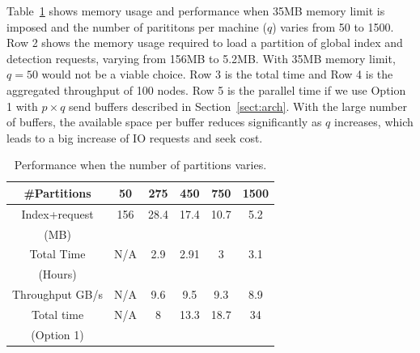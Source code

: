  
Table~\ref{tab:overall} shows memory usage and performance when 35MB memory limit is imposed and
the number of parititons per machine ($q$) varies from 50 to 1500.
Row 2 shows the memory usage required to load a partition of global index and detection requests,
varying from 156MB to 5.2MB. With  35MB memory limit,  $q=50$ would not be a viable choice.
Row 3 is the total time and Row 4 is  the aggregated throughput of  100 nodes.
Row 5 is  the parallel time if  we use Option 1 with $p\times q$ send buffers 
described in Section~\ref{sect:arch}. 
With the large number of buffers, the available space per buffer reduces significantly as $q$ increases, which leads to
a big increase of IO requests and seek cost.  

\begin{table}[hbt]
\caption{ Performance when the number of partitions varies.}
\begin{center}
\begin{tabular} {|c|c|c|c|c|c|}
\hline \#Partitions  & 50 & 275  &450 &  750 &  1500 \\
\hline Index+request & 156&  28.4 & 17.4 & 10.7 & 5.2 \\
  (MB)           &  &   &  & &  \\

\hline Total Time  & N/A&  2.9 & 2.91 & 3 & 3.1 \\
  (Hours)           &  &   &  & &  \\
\hline Throughput GB/s& N/A&  9.6& 9.5 & 9.3 & 8.9 \\
\hline Total time & N/A&  8& 13.3 & 18.7 & 34 \\
  (Option 1)           &  &   &  & &  \\
\hline
\end{tabular}
\end{center}
\label{tab:overall}
\end{table}

%

